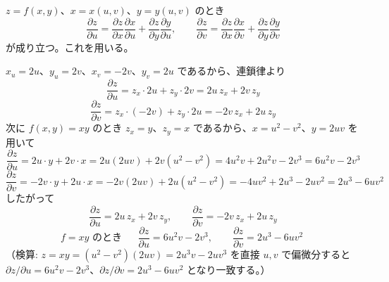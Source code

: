
$z=f(x,y)$、$x=x(u,v)$、$y=y(u,v)$ のとき
\[
\frac{\partial z}{\partial u} = \frac{\partial z}{\partial x}\frac{\partial x}{\partial u} + \frac{\partial z}{\partial y}\frac{\partial y}{\partial u}, \qquad
\frac{\partial z}{\partial v} = \frac{\partial z}{\partial x}\frac{\partial x}{\partial v} + \frac{\partial z}{\partial y}\frac{\partial y}{\partial v}
\]
が成り立つ。これを用いる。

$x_{u} = 2u$、$y_{u} = 2v$、$x_{v} = -2v$、$y_{v} = 2u$ であるから、連鎖律より
\[
\frac{\partial z}{\partial u} = z_{x}\cdot 2u + z_{y}\cdot 2v = 2u\,z_{x} + 2v\,z_{y}
\]
\[
\frac{\partial z}{\partial v} = z_{x}\cdot(-2v) + z_{y}\cdot 2u = -2v\,z_{x} + 2u\,z_{y}
\]
次に $f(x,y) = xy$ のとき $z_{x} = y$、$z_{y} = x$ であるから、$x = u^{2}-v^{2}$、$y=2uv$ を用いて
\[
\frac{\partial z}{\partial u} = 2u\cdot y + 2v\cdot x = 2u(2uv) + 2v(u^{2}-v^{2}) = 4u^{2}v + 2u^{2}v - 2v^{3} = 6u^{2}v - 2v^{3}
\]
\[
\frac{\partial z}{\partial v} = -2v\cdot y + 2u\cdot x = -2v(2uv) + 2u(u^{2}-v^{2}) = -4uv^{2} + 2u^{3} - 2uv^{2} = 2u^{3} - 6uv^{2}
\]
したがって
\[
\boxed{\; \frac{\partial z}{\partial u} = 2u\,z_{x}+2v\,z_{y},\qquad \frac{\partial z}{\partial v} = -2v\,z_{x}+2u\,z_{y} \;}
\]
\[
f=xy \text{ のとき }\quad
\boxed{\; \frac{\partial z}{\partial u} = 6u^{2}v-2v^{3},\qquad \frac{\partial z}{\partial v} = 2u^{3}-6uv^{2} \;}
\]
（検算: $z = xy = (u^{2}-v^{2})(2uv) = 2u^{3}v - 2uv^{3}$ を直接 $u,v$ で偏微分すると $\partial z/\partial u = 6u^{2}v-2v^{3}$、$\partial z/\partial v = 2u^{3}-6uv^{2}$ となり一致する。）

